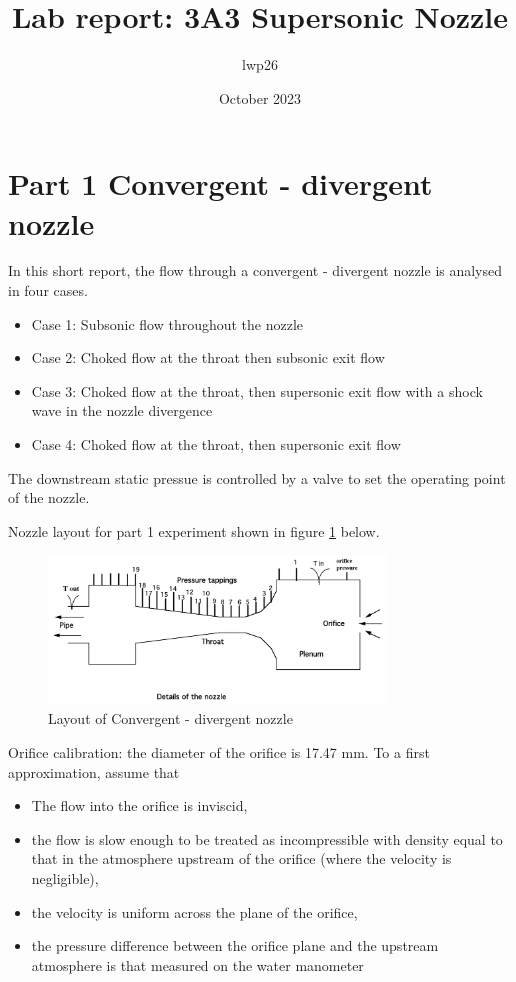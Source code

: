 \documentclass[8pt]{article}
\begin{document}

\title{Lab report: 3A3 Supersonic Nozzle}
\author{lwp26}
\date{October 2023}
\maketitle

\section{Part 1 Convergent - divergent nozzle}

In this short report, the flow through a convergent - divergent nozzle is analysed in four cases.

\begin{itemize}
    \item Case 1: Subsonic flow throughout the nozzle
    \item Case 2: Choked flow at the throat then subsonic exit flow
    \item Case 3: Choked flow at the throat, then supersonic exit flow with a shock wave in the nozzle divergence
    \item Case 4: Choked flow at the throat, then supersonic exit flow
\end{itemize}

The downstream static pressue is controlled by a valve to set the operating point of the nozzle.

Nozzle layout for part 1 experiment shown in figure \ref{fig:figure1} below.

\begin{figure}[H]
    \centering
    \includegraphics[width=0.8\textwidth]{small_nozzle_layout.png}
    \caption{Layout of Convergent - divergent nozzle}
    \label{fig:figure1}
\end{figure}

Orifice calibration: the diameter of the orifice is 17.47 mm. To a first approximation, assume that
\begin{itemize}
    \item The flow into the orifice is inviscid,
    \item the flow is slow enough to be treated as incompressible with density equal to that in the atmosphere upstream of the orifice (where the velocity is negligible),
    \item the velocity is uniform across the plane of the orifice,
    \item the pressure difference between the orifice plane and the upstream atmosphere is that measured on the
    water manometer
\end{itemize} 
\end{document}
